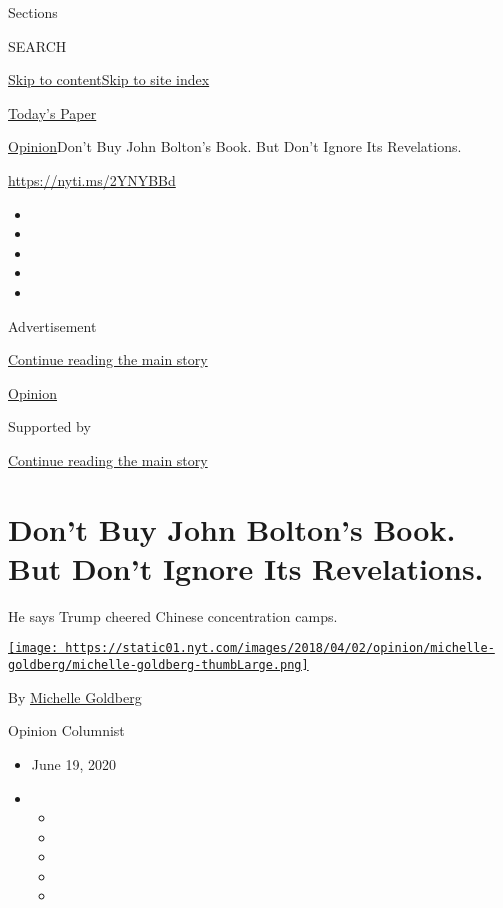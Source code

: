 Sections

SEARCH

\protect\hyperlink{site-content}{Skip to
content}\protect\hyperlink{site-index}{Skip to site index}

\href{https://myaccount.nytimes.com/auth/login?response_type=cookie\&client_id=vi}{}

\href{https://www.nytimes.com/section/todayspaper}{Today's Paper}

\href{/section/opinion}{Opinion}\textbar{}Don't Buy John Bolton's Book.
But Don't Ignore Its Revelations.

\href{https://nyti.ms/2YNYBBd}{https://nyti.ms/2YNYBBd}

\begin{itemize}
\item
\item
\item
\item
\item
\end{itemize}

Advertisement

\protect\hyperlink{after-top}{Continue reading the main story}

\href{/section/opinion}{Opinion}

Supported by

\protect\hyperlink{after-sponsor}{Continue reading the main story}

\hypertarget{dont-buy-john-boltons-book-but-dont-ignore-its-revelations}{%
\section{Don't Buy John Bolton's Book. But Don't Ignore Its
Revelations.}\label{dont-buy-john-boltons-book-but-dont-ignore-its-revelations}}

He says Trump cheered Chinese concentration camps.

\href{https://www.nytimes.com/by/michelle-goldberg}{\texttt{[image: https://static01.nyt.com/images/2018/04/02/opinion/michelle-goldberg/michelle-goldberg-thumbLarge.png]}}

By \href{https://www.nytimes.com/by/michelle-goldberg}{Michelle
Goldberg}

Opinion Columnist

\begin{itemize}
\item
  June 19, 2020
\item
  \begin{itemize}
  \item
  \item
  \item
  \item
  \item
  \end{itemize}
\end{itemize}

